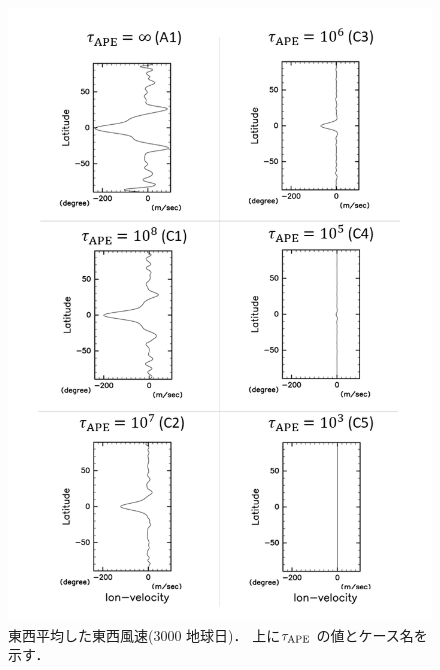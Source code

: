 \documentclass[a4j,12pt,openbib,oneside]{jreport}
\begin{document}
\begin{figure}[ht]
  \begin{center}
    \includegraphics[clip,width=14cm]{./fig/result/case2/case2_vellon.png}
    \caption{
      \footnotesize{東西平均した東西風速(3000 地球日)．
上に$\tau_{\rm{APE}}$ の値とケース名を示す．
      }
    }
    \label{fig:case2_vellon}
  \end{center}
\end{figure}
%
\end{document}
